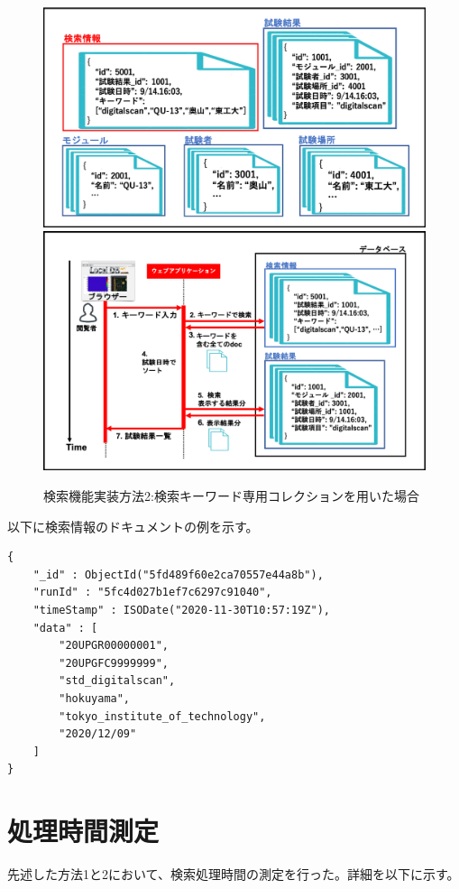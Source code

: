 \begin{figure}[bpt]
  \begin{center}
    \includegraphics[width=14cm]{search_mongo_collection}
    \includegraphics[width=14cm]{search_mongo_collection_flow}
  \caption[検索機能実装方法2:検索キーワード専用コレクションを用いた場合]{検索機能実装方法2:検索キーワード専用コレクションを用いた場合}
  \label{search_mongo_collection}
  \end{center}
\end{figure}

以下に検索情報のドキュメントの例を示す。
\begin{lstlisting}[caption=hoge,label=fuga]
{
	"_id" : ObjectId("5fd489f60e2ca70557e44a8b"),
	"runId" : "5fc4d027b1ef7c6297c91040",
	"timeStamp" : ISODate("2020-11-30T10:57:19Z"),
	"data" : [
		"20UPGR00000001",
		"20UPGFC9999999",
		"std_digitalscan",
		"hokuyama",
		"tokyo_institute_of_technology",
		"2020/12/09"
	]
}
\end{lstlisting}

\section{処理時間測定} \label{sec:search_process_time_mes}
先述した方法1と2において、検索処理時間の測定を行った。詳細を以下に示す。


